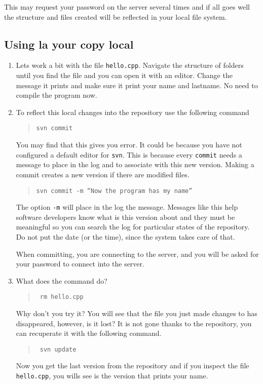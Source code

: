 \documentclass[article,12pt]{article}
\begin{document}
This may request your password on the server several times and if all goes well
the structure and files created will be reflected in your local file system.
\subsection*{ Using la your copy local}

\begin{enumerate}
\item Lets work a bit with the file
 {\tt hello.cpp}.
Navigate the structure of folders until you find the file
and you can open it with an editor.
Change the message it prints and make sure it print your name and
lastname. No need to compile the program now.

\item To reflect this local changes into the repository
use the following command
\begin{quote}
{\tt svn commit
}
\end{quote}
You may find that this gives you error. It could be because you have not configured
a default editor for {\tt svn}.
This is because every {\tt commit} needs a message to place in the log and to
associate with this new version. Making a commit creates a new version
if there are modified files.
\begin{quote}
{\tt svn commit -m ``Now the program has my name''
}
\end{quote}
The option {\tt -m} will place in the log the message.
Messages like this help software developers know what is this version
about and they must be meaningful so you can search the log for
particular states of the repository. Do not put the date (or the time),
since the system takes care of that.

When committing, you are connecting to the server, and you will be asked for 
your password to connect into the server.

\item What does the command do?
\begin{quote}
{\tt
rm hello.cpp
}
\end{quote}
Why don't you try it? You will see that the file you just made changes
to has disappeared, however, is it lost?
It is not gone thanks to the repository, you can recuperate it with the following
command.
\begin{quote}
{\tt
svn update
}
\end{quote}
Now you get the last version from the repository and if you inspect the file
{\tt hello.cpp}, you wills see is the version that prints your name.

\end{enumerate}
\end{document}
